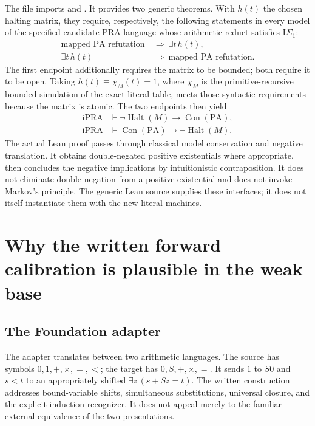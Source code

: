 \documentclass[11pt]{article}
\newcommand{\IPRA}{\mathrm{iPRA}}
\newcommand{\PA}{\mathrm{PA}}
\newcommand{\IS}{\mathrm{I}\Sigma_1}
\newcommand{\Con}{\operatorname{Con}}
\newcommand{\Halt}{\operatorname{Halt}}
\begin{document}
The file
imports  and
.  It provides two
generic theorems.  With \(h(t)\) the chosen halting matrix, they require,
respectively, the following statements in every model of the specified
candidate PRA language whose arithmetic reduct satisfies \(\IS\):
\begin{align*}
 \text{mapped PA refutation}&\ \Longrightarrow\ \exists t\,h(t),\\
 \exists t\,h(t)&\ \Longrightarrow\ \text{mapped PA refutation}.
\end{align*}
The first endpoint additionally requires the matrix to be bounded; both
require it to be open.  Taking \(h(t)\equiv\chi_M(t)=1\), where
\(\chi_M\) is the primitive-recursive bounded simulation of the exact
literal table, meets those syntactic requirements because the matrix is
atomic.  The two endpoints then yield
\begin{align*}
 \IPRA&\vdash\neg\Halt(M)\to\Con(\PA),\\
 \IPRA&\vdash\Con(\PA)\to\neg\Halt(M).
\end{align*}
The actual Lean proof passes through classical model conservation and
negative translation.  It obtains double-negated positive existentials
where appropriate, then concludes the negative implications by
intuitionistic contraposition.  It does not eliminate double negation
from a positive existential and does not invoke Markov's principle.
The generic Lean source supplies these interfaces; it does not itself
instantiate them with the new literal machines.\cite{transfer}

\section{Why the written forward calibration is plausible in the weak base}

\subsection{The Foundation adapter}

The adapter translates between two arithmetic languages.  The source
has symbols \(0,1,+,\times,=,<\); the target has \(0,S,+,\times,=\).
It sends \(1\) to \(S0\) and \(s<t\) to an appropriately shifted
\(\exists z\,(s+Sz=t)\).  The written construction addresses bound-variable
shifts, simultaneous substitutions, universal closure, and the explicit
induction recognizer.  It does not appeal merely to the familiar
external equivalence of the two presentations.\cite{adapter}
\end{document}
